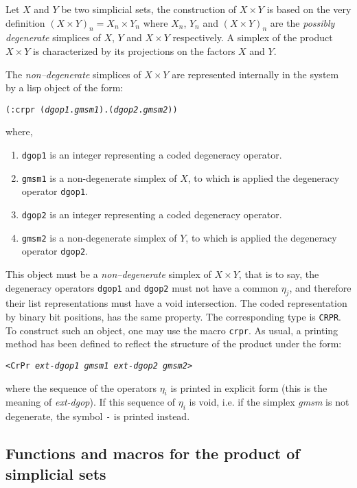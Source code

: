 {Let $X$ and $Y$ be two simplicial
sets, the construction of $X\times Y$ is based on the very definition $(X\times Y)_n =X_n\times Y_n$
where $X_n$, $Y_n$ and $(X\times Y)_n$ are the {\em possibly degenerate} simplices of $X$, $Y$ and $X\times Y$
respectively. A simplex of the product $X\times Y$ is characterized  by its projections on the factors $X$ and $Y$.
\par
The {\em non--degenerate} simplices of $X\times Y$  are
represented internally in the system by a lisp object of the form:
\begin{center}
{\tt (:crpr ({\em dgop1}.{\em gmsm1}).({\em dgop2}.{\em gmsm2}))}
\end{center}
where,
\begin{enumerate}
\item {\tt dgop1} is an integer representing a coded degeneracy operator.
\item {\tt gmsm1} is a non-degenerate simplex of $X$, to which is applied the degeneracy operator
{\tt dgop1}.
\item {\tt dgop2} is an integer representing a coded degeneracy operator.
\item {\tt gmsm2} is a non-degenerate simplex of $Y$, to which is applied the degeneracy operator
{\tt dgop2}.
\end{enumerate}
This object must be a {\em non--degenerate} simplex of $X \times Y$,
that is to say, the degeneracy operators {\tt dgop1} and {\tt dgop2} must not have a common $\eta_j$, and
therefore their list representations must have a void intersection.
The coded representation by  binary bit positions, has the same property. The corresponding type
is {\tt CRPR}.
To construct such an object, one may use the macro {\tt crpr}. As usual, a printing method
has been defined to reflect the structure of the product under the form:
\begin{center}
{\tt <CrPr {\em ext-dgop1 gmsm1 ext-dgop2 gmsm2}> }
\end{center}
where  the sequence of the operators $\eta_i$ is printed in explicit form (this is the meaning of {\em ext-dgop}).
If this sequence of $\eta_i$  is void, i.e. if the simplex {\em gmsm} is not degenerate,
the symbol {\tt -} is printed instead.
\newpage

\subsection {Functions and macros for the product of simplicial sets}

}
